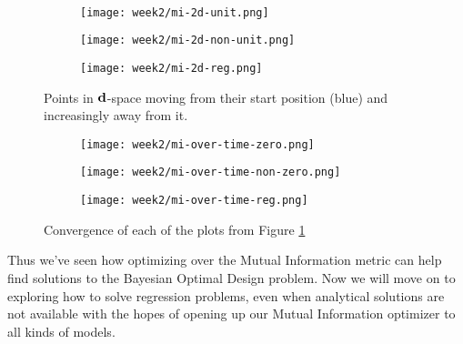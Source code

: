 \\
\begin{figure}
  \begin{subfigure}{.33\textwidth}
    \texttt{[image: week2/mi-2d-unit.png]}
  \end{subfigure}
  \begin{subfigure}{.33\textwidth}
    \texttt{[image: week2/mi-2d-non-unit.png]}
  \end{subfigure}
  \begin{subfigure}{.33\textwidth}
    \texttt{[image: week2/mi-2d-reg.png]}
  \end{subfigure}
  \centering
  \caption{Points in $\mathbf{d}$-space moving from their start position (blue) and increasingly away from it.}
  \label{fig:mi-2d}
\end{figure}
\begin{figure}
  \begin{subfigure}{.33\textwidth}
    \texttt{[image: week2/mi-over-time-zero.png]}
  \end{subfigure}
  \begin{subfigure}{.33\textwidth}
    \texttt{[image: week2/mi-over-time-non-zero.png]}
  \end{subfigure}
  \begin{subfigure}{.33\textwidth}
    \texttt{[image: week2/mi-over-time-reg.png]}
  \end{subfigure}
  \centering
  \caption{Convergence of each of the plots from Figure \ref{fig:mi-2d}}
  \label{fig:mi-over-time}
\end{figure}
Thus we've seen how optimizing over the Mutual Information metric can help find solutions to the Bayesian Optimal Design problem.
Now we will move on to exploring how to solve regression problems, even when analytical solutions are not available with the hopes of opening up our Mutual Information optimizer to all kinds of models.
